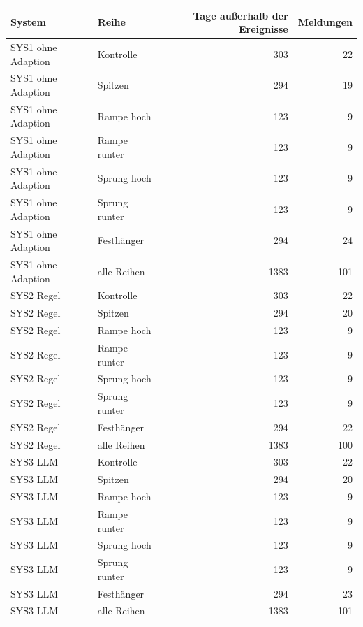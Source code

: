 \begin{tabular}{llrr}
\toprule
System & Reihe & Tage außerhalb der Ereignisse & Meldungen \\
\midrule
SYS1 ohne Adaption & Kontrolle & 303 & 22 \\
SYS1 ohne Adaption & Spitzen & 294 & 19 \\
SYS1 ohne Adaption & Rampe hoch & 123 & 9 \\
SYS1 ohne Adaption & Rampe runter & 123 & 9 \\
SYS1 ohne Adaption & Sprung hoch & 123 & 9 \\
SYS1 ohne Adaption & Sprung runter & 123 & 9 \\
SYS1 ohne Adaption & Festhänger & 294 & 24 \\
SYS1 ohne Adaption & alle Reihen & 1383 & 101 \\
SYS2 Regel & Kontrolle & 303 & 22 \\
SYS2 Regel & Spitzen & 294 & 20 \\
SYS2 Regel & Rampe hoch & 123 & 9 \\
SYS2 Regel & Rampe runter & 123 & 9 \\
SYS2 Regel & Sprung hoch & 123 & 9 \\
SYS2 Regel & Sprung runter & 123 & 9 \\
SYS2 Regel & Festhänger & 294 & 22 \\
SYS2 Regel & alle Reihen & 1383 & 100 \\
SYS3 LLM & Kontrolle & 303 & 22 \\
SYS3 LLM & Spitzen & 294 & 20 \\
SYS3 LLM & Rampe hoch & 123 & 9 \\
SYS3 LLM & Rampe runter & 123 & 9 \\
SYS3 LLM & Sprung hoch & 123 & 9 \\
SYS3 LLM & Sprung runter & 123 & 9 \\
SYS3 LLM & Festhänger & 294 & 23 \\
SYS3 LLM & alle Reihen & 1383 & 101 \\
\bottomrule
\end{tabular}
